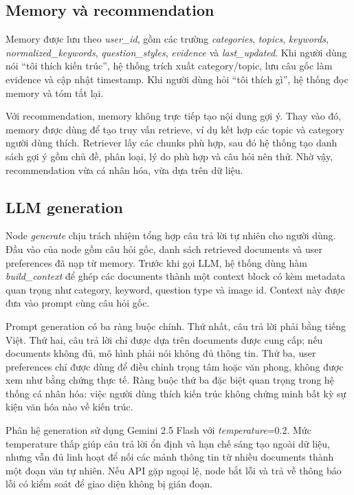 \documentclass[11pt]{article}
\begin{document}
\subsection{Memory và recommendation}

Memory được lưu theo \textit{user\_id}, gồm các trường \textit{categories}, \textit{topics}, \textit{keywords}, \textit{normalized\_keywords}, \textit{question\_styles}, \textit{evidence} và \textit{last\_updated}. Khi người dùng nói ``tôi thích kiến trúc'', hệ thống trích xuất category/topic, lưu câu gốc làm evidence và cập nhật timestamp. Khi người dùng hỏi ``tôi thích gì'', hệ thống đọc memory và tóm tắt lại.

Với recommendation, memory không trực tiếp tạo nội dung gợi ý. Thay vào đó, memory được dùng để tạo truy vấn retrieve, ví dụ kết hợp các topic và category người dùng thích. Retriever lấy các chunks phù hợp, sau đó hệ thống tạo danh sách gợi ý gồm chủ đề, phân loại, lý do phù hợp và câu hỏi nên thử. Nhờ vậy, recommendation vừa cá nhân hóa, vừa dựa trên dữ liệu.

\subsection{LLM generation}

Node \textit{generate} chịu trách nhiệm tổng hợp câu trả lời tự nhiên cho người dùng. Đầu vào của node gồm câu hỏi gốc, danh sách retrieved documents và user preferences đã nạp từ memory. Trước khi gọi LLM, hệ thống dùng hàm \textit{build\_context} để ghép các documents thành một context block có kèm metadata quan trọng như category, keyword, question type và image id. Context này được đưa vào prompt cùng câu hỏi gốc.

Prompt generation có ba ràng buộc chính. Thứ nhất, câu trả lời phải bằng tiếng Việt. Thứ hai, câu trả lời chỉ được dựa trên documents được cung cấp; nếu documents không đủ, mô hình phải nói không đủ thông tin. Thứ ba, user preferences chỉ được dùng để điều chỉnh trọng tâm hoặc văn phong, không được xem như bằng chứng thực tế. Ràng buộc thứ ba đặc biệt quan trọng trong hệ thống cá nhân hóa: việc người dùng thích kiến trúc không chứng minh bất kỳ sự kiện văn hóa nào về kiến trúc.

Phân hệ generation sử dụng Gemini 2.5 Flash với \textit{temperature}=0.2. Mức temperature thấp giúp câu trả lời ổn định và hạn chế sáng tạo ngoài dữ liệu, nhưng vẫn đủ linh hoạt để nối các mảnh thông tin từ nhiều documents thành một đoạn văn tự nhiên. Nếu API gặp ngoại lệ, node bắt lỗi và trả về thông báo lỗi có kiểm soát để giao diện không bị gián đoạn.
\end{document}

